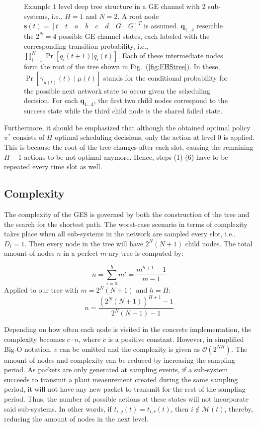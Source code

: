 \begin{sidewaysfigure}
	\centering
   
  \caption[GES: Example tree structure for $N=2$ and $H=1$]{Example $1$ level
  deep tree structure in a GE channel with $2$ sub-systems, i.e., $H=1$ and
  $N=2$. A root node $\boldsymbol{s}(t)=\left[t\quad t\quad a\quad b\quad c\quad
  d\quad G\quad G \right]^T$ is assumed. $\boldsymbol{q}_ {1\dots 4}$ resemble
  the $2^N=4$ possible GE channel states, each labeled with the corresponding
  transition probability, i.e., $\prod_{i=1}^{N}{\Pr[q_i(t+1) |q_i(t)]}$. Each
  of these intermediate nodes form the root of the tree shown in
  Fig.~(\ref{fig:FHStree}). In these, $\Pr[\gamma_{\mu(t)}(t)\mid \mu(t)]$
  stands for the conditional probability for the possible next network state to
  occur given the scheduling decision. For each $\boldsymbol{q}_{1\dots 4}$, the
  first two child nodes correspond to the success state while the third child
  node is the shared failed state.}
	\label{fig:GEStree}
\end{sidewaysfigure}

Furthermore, it should be emphasized that although the obtained optimal policy
$\pi^*$ consists of $H$ optimal scheduling decisions, only the action at level 0
is applied. This is because the root of the tree changes after each slot,
causing the remaining $H-1$ actions to be not optimal anymore. Hence, steps
(1)-(6) have to be repeated every time slot as well. 

\subsection{Complexity}

The complexity of the GES is governed by both the construction of the tree and
the search for the shortest path. The worst-case scenario in terms of complexity
takes place when all sub-systems in the network are sampled every slot, i.e.,
$D_i=1$. Then every node in the tree will have $2^N(N+1)$ child nodes. The total
amount of nodes $n$ in a perfect $m$-ary tree is computed by:

\begin{equation}
  n = \sum_{i=0}^{h}m^i = \frac{m^{h+1}-1}{m-1}
\end{equation}
Applied to our tree with $m=2^N(N+1)$ and $h=H$: 
\begin{equation}
  n = \frac{(2^N(N+1))^{H+1}-1}{2^N(N+1)-1} 
\end{equation} 

Depending on how often each node is visited in the concrete implementation, the
complexity becomes $c \cdot n$, where $c$ is a positive constant. However, in
simplified Big-O notation, $c$ can be omitted and the complexity is given as
$\mathcal{O}(2^{NH})$. The amount of nodes and complexity can be reduced by
increasing the sampling period. As packets are only generated at sampling
events, if a sub-system succeeds to transmit a plant measurement created during
the same sampling period, it will not have any new packet to transmit for the
rest of the sampling period. Thus, the number of possible actions at these
states will not incorporate said sub-systems. In other words, if $t_{i,g}(t) =
t_{i,r}(t)$, then $i \not \in \mathcal{M}(t)$, thereby, reducing the amount of
nodes in the next level.
